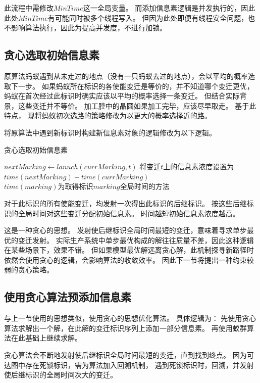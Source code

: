 此流程中需修改$MinTime$这一全局变量。
而添加信息素逻辑是并发执行的，因此此处$MinTime$有可能同时被多个线程写入。
但因为此处即便有线程安全问题，也不影响算法执行，因此为提高并发度，不进行加锁。
\subsection{贪心选取初始信息素}
原算法蚂蚁遇到从未走过的地点（没有一只蚂蚁去过的地点），会以平均的概率选取下一步。
如果蚂蚁所在标识的各使能变迁是等价的，并不知道哪个变迁更优，蚂蚁在首次经过此标识时确实应该以平均的概率选择一条变迁。
但结合实际背景，这些变迁并不等价。
加工腔中的晶圆如果加工完毕，应该尽早取走。
基于此特点，
现将蚂蚁初次选路的策略修改为以更大的概率选择近的路。

将原算法中遇到新标识时构建新信息素对象的逻辑修改为以下逻辑。
\begin{algorithm}[H]
	\caption{贪心选取初始信息素}
	\label{alg4-11}
	\begin{algorithmic}
					\State $nextMarking \leftarrow lanuch(currMarking,t)$
					\State 将变迁$t$上的信息素浓度设置为$time(nextMarking)-time(currMarking)$
					\\$time(marking)$为取得标识$marking$全局时间的方法
				\EndIf
			\EndFor
		\EndProcedure
	\end{algorithmic}
\end{algorithm}
对于此标识的所有使能变迁，均发射一次得出此标识的后继标识。
按这些后继标识的全局时间对这些变迁分配初始信息素。
时间越短初始信息素浓度越高。

这是一种贪心的思想。
发射使后继标识全局时间最短的变迁，意味着寻求单步最优的变迁发射。
实际生产系统中单步最优构成的解往往质量不差，因此这种逻辑在某些场景下，效果不错。
但如果模型最优解远离贪心解，此机制探寻新路径时依然会使用贪心的逻辑，会影响算法的收敛效率。
因此下一节将提出一种约束较弱的贪心策略。
\subsection{使用贪心算法预添加信息素}
与上一节使用的思想类似，使用贪心的思想优化算法。
具体逻辑为：
先使用贪心算法求解出一个解，在此解的变迁标识序列上添加一部分信息素。
再使用蚁群算法在此基础上继续求解。

贪心算法会不断地发射使后继标识全局时间最短的变迁，直到找到终点。
因为可达图中存在死锁标识，需为算法加入回溯机制，
遇到死锁标识时，回溯，并发射使后继标识的全局时间次大的变迁。

